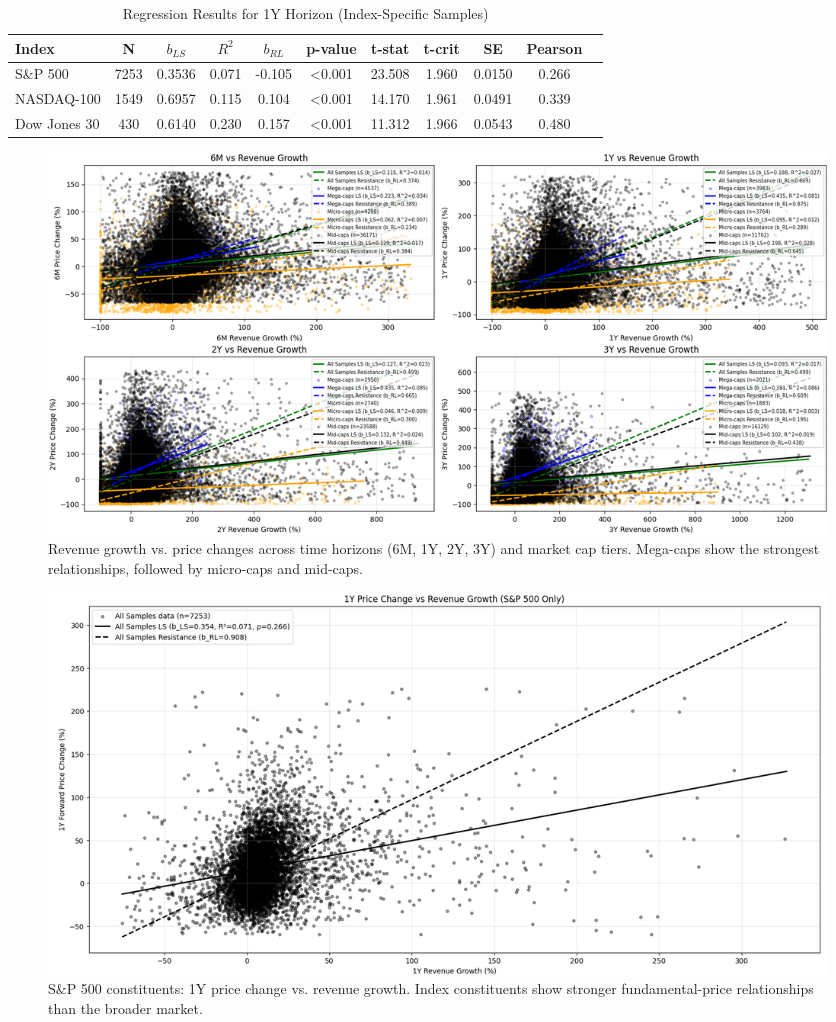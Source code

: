 \documentclass[11pt]{article}
\begin{document}
\begin{table}[!htbp]
\centering
\caption{Regression Results for 1Y Horizon (Index-Specific Samples)}
\label{tab:regression-1y-index}
\small
\begin{tabular}{lcccccccccc}
\toprule
Index & N & $b_{LS}$ & $R^2$ & $b_{RL}$ & p-value & t-stat & t-crit & SE & Pearson \\
\midrule
S\&P 500     & 7253 & 0.3536 & 0.071 & -0.105 & <0.001 & 23.508 & 1.960 & 0.0150 & 0.266 \\
NASDAQ-100   & 1549 & 0.6957 & 0.115 &  0.104 & <0.001  & 14.170 & 1.961 & 0.0491 & 0.339 \\
Dow Jones 30 &  430 & 0.6140 & 0.230 &  0.157 & <0.001 & 11.312 & 1.966 & 0.0543 & 0.480 \\
\bottomrule
\end{tabular}
\end{table}

\begin{figure}[!htbp]
\centering
\includegraphics[width=\textwidth]{images/all_horizons_all_stocks_single_plot.png}
\caption{Revenue growth vs. price changes across time horizons (6M, 1Y, 2Y, 3Y) and market cap tiers. Mega-caps show the strongest relationships, followed by micro-caps and mid-caps.}
\label{fig:revenue-by-cap}
\end{figure}
\begin{figure}[!htbp]
\centering
\includegraphics[width=\textwidth]{images/1_year_sp500_plot.png}
\caption{S\&P 500 constituents: 1Y price change vs. revenue growth. Index constituents show stronger fundamental-price relationships than the broader market.}
\label{fig:sp500}
\end{figure}
\end{document}
